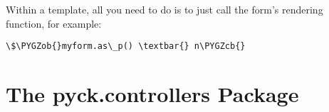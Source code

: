 \documentclass[letterpaper,10pt,english]{sphinxmanual}
\def\PYGZob{\char`\{}
\def\PYGZcb{\char`\}}
\begin{document}
Within a template, all you need to do is to just call the form's rendering function, for example:

\begin{Verbatim}[commandchars=\\\{\}]
\$\PYGZob{}myform.as\_p() \textbar{} n\PYGZcb{}
\end{Verbatim}


\chapter{The pyck.controllers Package}
\label{pyck-controllers:module-pyck.controllers}\label{pyck-controllers:the-pyck-controllers-package}\label{pyck-controllers::doc}\label{pyck-controllers:pyck-controllers}
\end{document}
